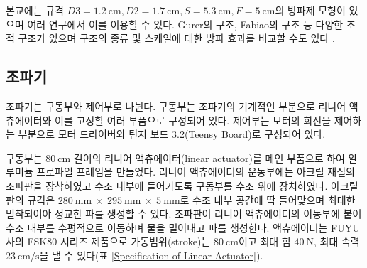 본교에는 규격 $D3=1.2\mathrm{~cm}, D2=1.7\mathrm{~cm}, S=5.3\mathrm{~cm}, F=5\mathrm{~cm}$의 방파제 모형이 있으며 여러 연구에서 이를 이용할 수 있다. Gurer의 구조, Fabiao의 구조 등 다양한 조적 구조가 있으며 구조의 종류 및 스케일에 대한 방파 효과를 비교할 수도 있다 \cite{article}.

\subsection{조파기}

조파기는 구동부와 제어부로 나뉜다. 구동부는 조파기의 기계적인 부분으로 리니어 액츄에이터와 이를 고정할 여러 부품으로 구성되어 있다. 제어부는 모터의 회전을 제어하는 부분으로 모터 드라이버와 틴지 보드 3.2(Teensy Board)로 구성되어 있다.


구동부는 $80\mathrm{~cm}$ 길이의 리니어 액츄에이터(linear actuator)를 메인 부품으로 하여 알루미늄 프로파일 프레임을 만들었다. 리니어 액츄에이터의 운동부에는 아크릴 재질의 조파판을 장착하였고 수조 내부에 들어가도록 구동부를 수조 위에 장치하였다. 아크릴 판의 규격은 $280\mathrm{~mm} ~\times~ 295\mathrm{~mm} ~\times~5\mathrm{~mm}$로 수조 내부 공간에 딱 들어맞으며 최대한 밀착되어야 정교한 파를 생성할 수 있다. 조파판이 리니어 액츄에이터의 이동부에 붙어 수조 내부를 수평적으로 이동하며 물을 밀어내고 파를 생성한다. 액츄에이터는 FUYU 사의 FSK80 시리즈 제품으로 가동범위(stroke)는 $80\mathrm{~cm}$이고 최대 힘 $40\mathrm{~N}$, 최대 속력 $23\mathrm{~cm/s}$을 낼 수 있다(표 \ref{Specification of Linear Actuator}).

  
